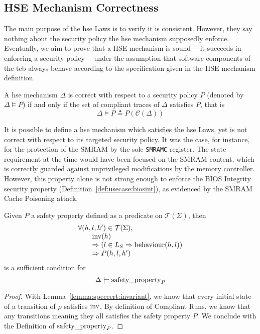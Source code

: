 \subsection{HSE Mechanism Correctness}
\label{subsec:speccert:correct}

The main purpose of the \ac{hse} Laws is to verify it is consistent.
%
However, they say nothing about the security policy the \ac{hse} mechanism
supposedly enforce.
%
Eventually, we aim to prove that a HSE mechanism is sound ---it succeeds in
enforcing a security policy--- under the assumption that software components of
the \ac{tcb} always behave according to the specification given in the HSE
mechanism definition.

\begin{definition}
  A \ac{hse} mechanism $\Delta$ is correct with respect to a security policy $P$
  (denoted by $\Delta \models P$) if and only if the set of compliant traces
  of $\Delta$ satisfies $P$, that is
  \[
    \Delta \models P \triangleq P(\mathcal{C}(\Delta))
  \]
\end{definition}

It is possible to define a \ac{hse} mechanism which satisfies the \ac{hse} Laws,
yet is not correct with respect to its targeted security policy.
%
It was the case, for instance, for the protection of the SMRAM by the sole
\texttt{SMRAMC} register.
%
The state requirement at the time would have been focused on the SMRAM content,
which is correctly guarded against unprivileged modifications by the memory
controller.
%
However, this property alone is not strong enough to enforce the BIOS Integrity
security property (Definition~\ref{def:usecase:biosint}), as evidenced by the
SMRAM Cache Poisoning attack.

\begin{theorem}
  Given $P$ a safety property defined as a predicate on $\mathcal{T}(\Sigma)$,
  then
  \[
    \begin{array}{l}
      \forall (h, l, h') \in \mathcal{T}(\Sigma), \\
      \qquad \mathrm{inv}(h) \\
      \qquad \Rightarrow (l \in L_{S} \Rightarrow \mathrm{behaviour}(h, l))\\
      \qquad \Rightarrow P(h, l, h')
    \end{array}
  \]
  is a sufficient condition for
  \[
    \Delta \models \mathrm{safety\_property}_{P}
  \]

  \begin{proof}
    With Lemma~\ref{lemma:speccert:invariant}, we know that every initial state
    of a transition of $\rho$ satisfies $\mathrm{inv}$.
    By definition of Compliant Runs, we know that any transitions meaning they
    all satisfies the safety property $P$.
    We conclude with the Definition of $\mathrm{safety\_property}_{P}$.
  \end{proof}
\end{theorem}

